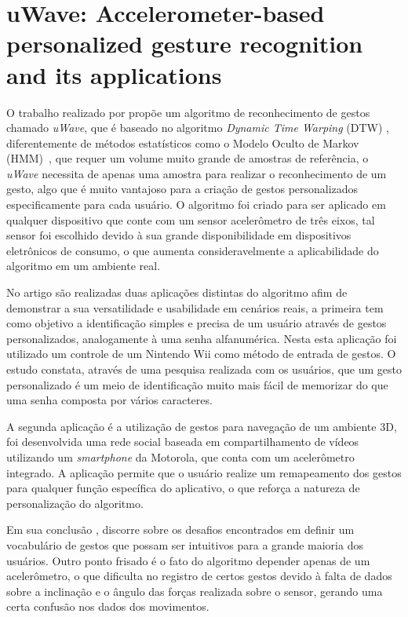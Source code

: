 \section{uWave: Accelerometer-based personalized gesture recognition and its applications}

O trabalho realizado por \cite{uwave:2009} propõe um algoritmo de reconhecimento de gestos chamado \textit{uWave}, que é baseado no algoritmo \textit{Dynamic Time Warping} (DTW) , diferentemente de métodos estatísticos como o Modelo Oculto de Markov (HMM)~\cite{hmm:1989}, que requer um volume muito grande de amostras de referência, o \textit{uWave} necessita de apenas uma amostra para realizar o reconhecimento de um gesto, algo que é muito vantajoso para a criação de gestos personalizados especificamente para cada usuário. O algoritmo foi criado para ser aplicado em qualquer dispositivo que conte com um sensor acelerômetro de três eixos, tal sensor foi escolhido devido à sua grande disponibilidade em dispositivos eletrônicos de consumo, o que aumenta consideravelmente a aplicabilidade do algoritmo em um ambiente real.

No artigo são realizadas duas aplicações distintas do algoritmo afim de demonstrar a sua versatilidade e usabilidade em cenários reais, a primeira tem como objetivo a identificação simples e precisa de um usuário através de gestos personalizados, analogamente à uma senha alfanumérica. Nesta esta aplicação foi utilizado um controle de um Nintendo Wii  como método de entrada de gestos. O estudo constata, através de uma pesquisa realizada com os usuários, que um gesto personalizado é um meio de identificação muito mais fácil de memorizar do que uma senha composta por vários caracteres. 

A segunda aplicação é a utilização de gestos para navegação de um ambiente 3D, foi desenvolvida uma rede social baseada em compartilhamento de vídeos utilizando um \textit{smartphone} da Motorola, que conta com um acelerômetro integrado. A aplicação permite que o usuário realize um remapeamento dos gestos para qualquer função específica do aplicativo, o que reforça a natureza de personalização do algoritmo.

Em sua conclusão \cite{uwave:2009}, discorre sobre os desafios encontrados em definir um vocabulário de gestos que possam ser intuitivos para a grande maioria dos usuários. Outro ponto frisado é o fato do algoritmo depender apenas de um acelerômetro, o que dificulta no registro de certos gestos devido à falta de dados sobre a inclinação e o ângulo das forças realizada sobre o sensor, gerando uma certa confusão nos dados dos movimentos.

